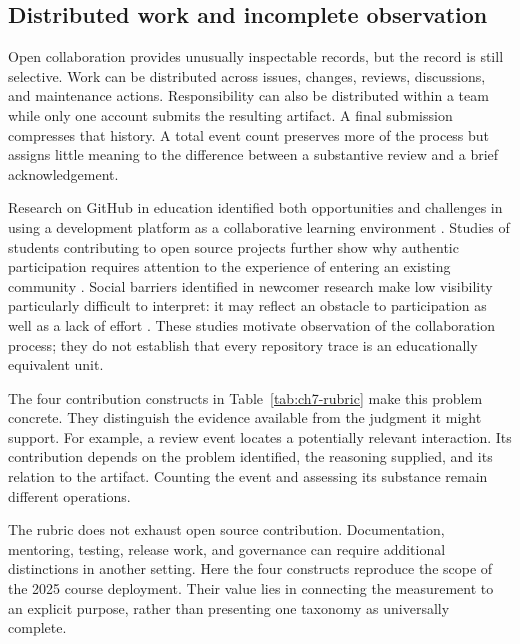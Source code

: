 \subsection{Distributed work and incomplete observation}
Open collaboration provides unusually inspectable records, but the record is still selective. Work can be distributed across issues, changes, reviews, discussions, and maintenance actions. Responsibility can also be distributed within a team while only one account submits the resulting artifact. A final submission compresses that history. A total event count preserves more of the process but assigns little meaning to the difference between a substantive review and a brief acknowledgement.

Research on GitHub in education identified both opportunities and challenges in using a development platform as a collaborative learning environment \citep{zagalsky2015}. Studies of students contributing to open source projects further show why authentic participation requires attention to the experience of entering an existing community \citep{pinto2019}. Social barriers identified in newcomer research make low visibility particularly difficult to interpret: it may reflect an obstacle to participation as well as a lack of effort \citep{steinmacher2015}. These studies motivate observation of the collaboration process; they do not establish that every repository trace is an educationally equivalent unit.

The four contribution constructs in Table~\ref{tab:ch7-rubric} make this problem concrete. They distinguish the evidence available from the judgment it might support. For example, a review event locates a potentially relevant interaction. Its contribution depends on the problem identified, the reasoning supplied, and its relation to the artifact. Counting the event and assessing its substance remain different operations.



The rubric does not exhaust open source contribution. Documentation, mentoring, testing, release work, and governance can require additional distinctions in another setting. Here the four constructs reproduce the scope of the 2025 course deployment. Their value lies in connecting the measurement to an explicit purpose, rather than presenting one taxonomy as universally complete.

